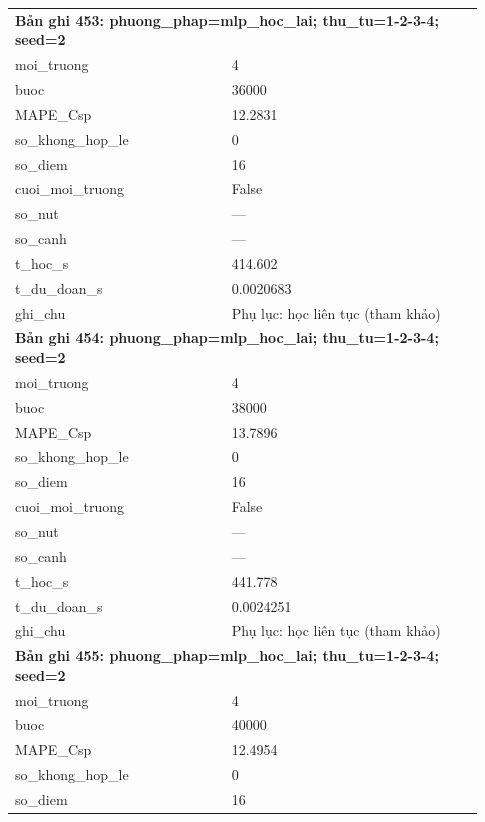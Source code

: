 \begin{longtable}{p{0.43\linewidth}p{0.50\linewidth}}
\midrule
\multicolumn{2}{p{0.95\linewidth}}{\textbf{Bản ghi 453: phuong\_phap=mlp\_hoc\_lai; thu\_tu=1-2-3-4; seed=2}} \\
moi\_\allowbreak truong & 4 \\
buoc & 36000 \\
MAPE\_\allowbreak Csp & 12.2831 \\
so\_\allowbreak khong\_\allowbreak hop\_\allowbreak le & 0 \\
so\_\allowbreak diem & 16 \\
cuoi\_\allowbreak moi\_\allowbreak truong & False \\
so\_\allowbreak nut & — \\
so\_\allowbreak canh & — \\
t\_\allowbreak hoc\_\allowbreak s & 414.602 \\
t\_\allowbreak du\_\allowbreak doan\_\allowbreak s & 0.0020683 \\
ghi\_\allowbreak chu & Phụ lục: học liên tục (tham khảo) \\
\midrule
\multicolumn{2}{p{0.95\linewidth}}{\textbf{Bản ghi 454: phuong\_phap=mlp\_hoc\_lai; thu\_tu=1-2-3-4; seed=2}} \\
moi\_\allowbreak truong & 4 \\
buoc & 38000 \\
MAPE\_\allowbreak Csp & 13.7896 \\
so\_\allowbreak khong\_\allowbreak hop\_\allowbreak le & 0 \\
so\_\allowbreak diem & 16 \\
cuoi\_\allowbreak moi\_\allowbreak truong & False \\
so\_\allowbreak nut & — \\
so\_\allowbreak canh & — \\
t\_\allowbreak hoc\_\allowbreak s & 441.778 \\
t\_\allowbreak du\_\allowbreak doan\_\allowbreak s & 0.0024251 \\
ghi\_\allowbreak chu & Phụ lục: học liên tục (tham khảo) \\
\midrule
\multicolumn{2}{p{0.95\linewidth}}{\textbf{Bản ghi 455: phuong\_phap=mlp\_hoc\_lai; thu\_tu=1-2-3-4; seed=2}} \\
moi\_\allowbreak truong & 4 \\
buoc & 40000 \\
MAPE\_\allowbreak Csp & 12.4954 \\
so\_\allowbreak khong\_\allowbreak hop\_\allowbreak le & 0 \\
so\_\allowbreak diem & 16 \\

\end{longtable}
